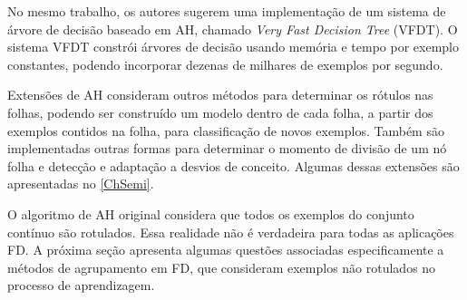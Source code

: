 No mesmo trabalho, os autores sugerem uma implementação de um sistema de árvore de decisão baseado em AH, chamado \emph{Very Fast Decision Tree} (VFDT). O sistema VFDT constrói árvores de decisão usando memória e tempo por exemplo constantes, podendo incorporar dezenas de milhares de exemplos por segundo.

Extensões de AH consideram outros métodos para determinar os rótulos nas folhas, podendo ser construído um modelo dentro de cada folha, a partir dos exemplos contidos na folha, para classificação de novos exemplos. Também são implementadas outras formas para determinar o momento de divisão de um nó folha e detecção e adaptação a desvios de conceito. Algumas dessas extensões são apresentadas no \autoref{ChSemi}.

O algoritmo de AH original considera que todos os exemplos do conjunto contínuo são rotulados. Essa realidade não é verdadeira para todas as aplicações FD. A próxima seção apresenta algumas questões associadas especificamente a métodos de agrupamento em FD, que consideram exemplos não rotulados no processo de aprendizagem.